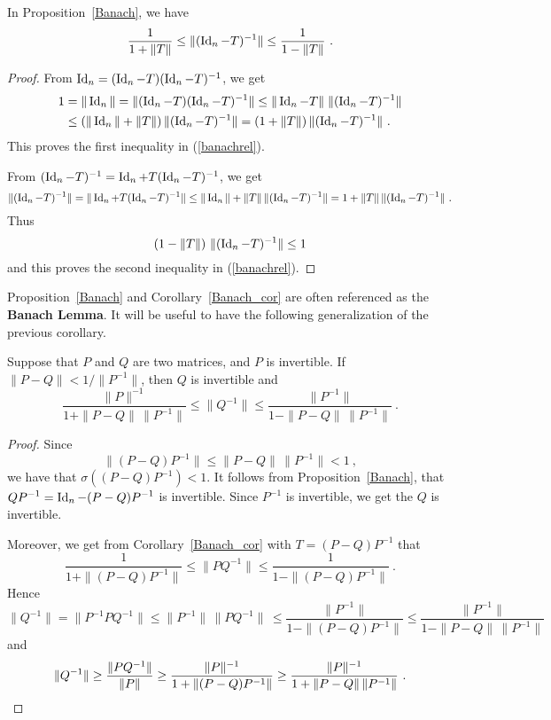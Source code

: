 \begin{cor}
In Proposition~\ref{Banach}, we have
\begin{equation}
\frac{1}{1+\|T\|} \leq \|(\operatorname{Id}_n-T)^{-1}\| \leq \frac{1}{1-\|T\|} \ .
\label{banachrel}
\end{equation}
\label{Banach_cor}
\end{cor}

\begin{proof}
From $\operatorname{Id}_n=(\operatorname{Id}_n-T)(\operatorname{Id}_n-T)^{-1}$, we get
\begin{align*}
1 &= \|\operatorname{Id}_n\| = \|(\operatorname{Id}_n-T)(\operatorname{Id}_n-T)^{-1}\| \leq
\|\operatorname{Id}_n-T\|\; \|(\operatorname{Id}_n-T)^{-1}\| \\
&\leq \left( \|\operatorname{Id}_n\|+\|T\| \right) \|(\operatorname{Id}_n-T)^{-1}\| 
= \left( 1 +\|T\| \right) \|(\operatorname{Id}_n-T)^{-1}\| \ .
\end{align*}
This proves the first inequality in (\ref{banachrel}).

From $(\operatorname{Id}_n-T)^{-1} = \operatorname{Id}_n + T (\operatorname{Id}_n - T)^{-1}$, we get
\[
\|(\operatorname{Id}_n-T)^{-1}\| = \|\operatorname{Id}_n + T (\operatorname{Id}_n - T)^{-1}\|
\leq \|\operatorname{Id}_n\| + \|T\|\,\|(\operatorname{Id}_n - T)^{-1}\|
= 1 + \|T\|\,\|(\operatorname{Id}_n - T)^{-1}\| \ .
\]
Thus
\[
\left(1 - \|T\|\right)\,\|(\operatorname{Id}_n-T)^{-1}\| \leq 1
\]
and this proves the second inequality in (\ref{banachrel}).
\end{proof}

Proposition~\ref{Banach} and Corollary~\ref{Banach_cor} are often
referenced as the {\bfseries Banach Lemma}.  It
will be useful to have the following generalization of the previous
corollary.

\begin{cor}
Suppose that $P$ and $Q$ are two \nn matrices, and $P$ is invertible.
If $\displaystyle \| P - Q \| < 1/\|P^{-1}\|$, then $Q$ is invertible
and
\[
\frac{\|P\|^{-1}}{1+\|P-Q\|\,\|P^{-1}\|} \leq \|Q^{-1}\| \leq
\frac{\|P^{-1}\|}{1-\|P-Q\|\,\|P^{-1}\|} \ .
\]
\label{Banach_corG}
\end{cor}

\begin{proof}
Since
\[
  \|(P-Q)P^{-1}\| \leq \| P-Q\|\,\|P^{-1}\| < 1 \ ,
\]
we have that $\displaystyle \sigma\left((P-Q)P^{-1}\right) < 1$.
It follows from Proposition~\ref{Banach}, that
$\displaystyle QP^{-1} = \operatorname{Id}_n - (P-Q)P^{-1}$ is invertible.
Since $P^{-1}$ is invertible, we get the $Q$ is invertible.

Moreover, we get from Corollary~\ref{Banach_cor} with $T=(P-Q)P^{-1}$ that
\[
\frac{1}{1+\|(P-Q)P^{-1}\|} \leq \| P Q^{-1} \| \leq
\frac{1}{1-\|(P-Q)P^{-1}\|} \ .
\]
Hence
\[
\|Q^{-1}\| = \|P^{-1} P Q^{-1}\| \leq \|P^{-1}\|\,\|PQ^{-1}\|\,
\leq \frac{\|P^{-1}\|}{1-\|(P-Q)P^{-1}\|}
\leq \frac{\|P^{-1}\|}{1-\|P-Q\|\,\|P^{-1}\|}
\]
and
\[
\|Q^{-1}\| \geq \frac{\|PQ^{-1}\|}{\|P\|}
\geq \frac{\|P\|^{-1}}{1+\|(P-Q)P^{-1}\|}
\geq \frac{\|P\|^{-1}}{1+\|P-Q\|\,\|P^{-1}\|} \ . \qedhere
\]
\end{proof}

